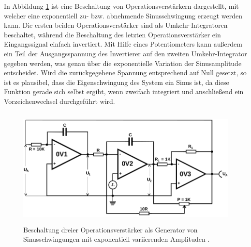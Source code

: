 In Abbildung \ref{fig:expsin} ist eine Beschaltung von Operationsverstärkern dargestellt, mit welcher
eine exponentiell zu- bzw. abnehmende Sinusschwingung erzeugt werden kann. Die ersten beiden Operationsverstärker
sind als Umkehr-Integratoren beschaltet, während die Beschaltung des letzten Operationsverstärker ein
Eingangssignal einfach invertiert. Mit Hilfe eines Potentiometers kann außerdem ein Teil der Ausgangsspannung
des Invertierer auf den zweiten Umkehr-Integrator gegeben werden, was genau über die exponentielle Variation
der Sinusamplitude entscheidet. Wird die zurückgegebene Spannung entsprechend auf Null gesetzt, so ist es plausibel,
dass die Eigenschwingung des System ein Sinus ist, da diese Funktion gerade sich selbst ergibt, wenn
zweifach integriert und anschließend ein Vorzeichenwechsel durchgeführt wird.

\begin{figure}
  \centering
  \includegraphics[height=6cm]{ImmerDieseNorweger/expsin.png}
  \caption{Beschaltung dreier Operationsverstärker als Generator von Sinusschwingungen mit exponentiell
  variierenden Amplituden \cite{anleitung}.}
  \label{fig:expsin}
\end{figure}


